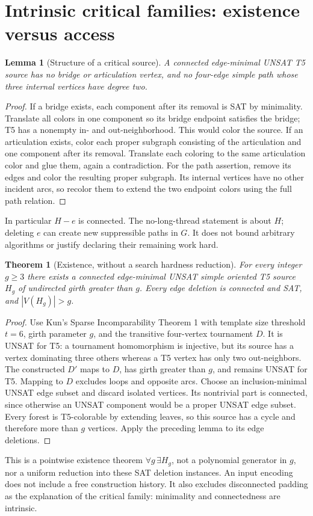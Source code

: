 \documentclass[11pt]{article}
\newtheorem{theorem}{Theorem}
\newtheorem{lemma}{Lemma}
\begin{document}
\section*{Intrinsic critical families: existence versus access}
\begin{lemma}[Structure of a critical source]
A connected edge-minimal UNSAT T5 source has no bridge or articulation vertex,
and no four-edge simple path whose three internal vertices have degree two.
\end{lemma}
\begin{proof}
If a bridge exists, each component after its removal is SAT by minimality.
Translate all colors in one component so its bridge endpoint satisfies the
bridge; T5 has a nonempty in- and out-neighborhood. This would color the source.
If an articulation exists, color each proper subgraph consisting of the
articulation and one component after its removal. Translate each coloring to
the same articulation color and glue them, again a contradiction.
For the path assertion, remove its edges and color the resulting proper
subgraph. Its internal vertices have no other incident arcs, so recolor them
to extend the two endpoint colors using the full path relation.
\end{proof}
In particular $H-e$ is connected. The no-long-thread statement is about $H$;
deleting $e$ can create new suppressible paths in $G$. It does not bound
arbitrary algorithms or justify declaring their remaining work hard.

\begin{theorem}[Existence, without a search hardness reduction]
For every integer $g\ge3$ there exists a connected edge-minimal UNSAT simple
oriented T5 source $H_g$ of undirected girth greater than $g$. Every edge
deletion is connected and SAT, and $|V(H_g)|>g$.
\end{theorem}
\begin{proof}
Use Kun's Sparse Incomparability Theorem 1 with template size threshold $t=6$,
girth parameter $g$, and the transitive four-vertex tournament $D$. It is UNSAT
for T5: a tournament homomorphism is injective, but its source has a vertex
dominating three others whereas a T5 vertex has only two out-neighbors.
The constructed $D'$ maps to $D$, has girth greater than $g$, and remains
UNSAT for T5. Mapping to $D$ excludes loops and opposite arcs. Choose an
inclusion-minimal UNSAT edge subset and discard isolated vertices. Its
nontrivial part is connected, since otherwise an UNSAT component would be a
proper UNSAT edge subset. Every forest is T5-colorable by extending leaves,
so this source has a cycle and therefore more than $g$ vertices. Apply the
preceding lemma to its edge deletions.
\end{proof}
This is a pointwise existence theorem $\forall g\,\exists H_g$, not a
polynomial generator in $g$, nor a uniform reduction into these SAT deletion
instances. An input encoding does not include a free construction history.
It also excludes disconnected padding as the explanation of the critical
family: minimality and connectedness are intrinsic.
\end{document}
